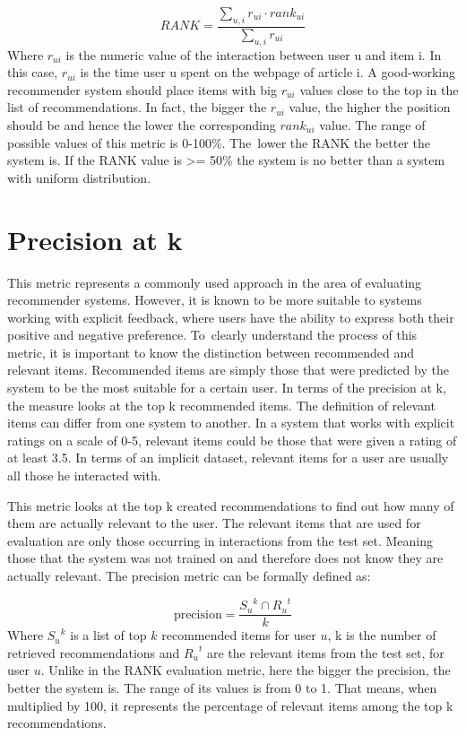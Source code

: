 \begin{equation}
    RANK = \frac{\sum_{u,i} r_{ui} \cdot rank_{ui}}{\sum_{u,i} r_{ui}}
\end{equation}
Where $r_{ui}$ is the numeric value of the interaction between user u and item i. In this case, $r_{ui}$ is the time user u spent on the webpage of article i. A good-working recommender system should place items with big $r_{ui}$ values close to the top in the list of recommendations. In fact, the bigger the $r_{ui}$ value, the higher the position should be and hence the lower the corresponding $rank_{ui}$ value. The range of possible values of this metric is 0-100\%. The~lower the RANK the better the system is. If the RANK value is >= 50\% the system is no better than a system with uniform distribution. \cite{Implicit}

\section{Precision at k}
This metric represents a commonly used approach in the area of evaluating recommender systems. However, it is known to be more suitable to systems working with explicit feedback, where users have the ability to express both their positive and negative preference. To~clearly understand the process of this metric, it is important to know the distinction between recommended and relevant items. Recommended items are simply those that were predicted by the system to be the most suitable for a certain user. In terms of the precision at k, the measure looks at the top k recommended items. The definition of relevant items can differ from one system to another. In a system that works with explicit ratings on a scale of 0-5, relevant items could be those that were given a rating of at least 3.5. In terms of an implicit dataset, relevant items for a user are usually all those he interacted with. 

This metric looks at the top k created recommendations to find out how many of them are actually relevant to the user. The relevant items that are used for evaluation are only those occurring in interactions from the test set. Meaning those that the system was not trained on and therefore does not know they are actually relevant. The precision metric can be formally defined as:

\begin{equation}
    \text{precision} = \frac{{S_u}^k \cap {R_u}^t}{k}
\end{equation}
Where ${S_u}^k$ is a list of top $k$ recommended items for user $u$, k is the number of retrieved recommendations and ${R_u}^t$ are the relevant items from the test set, for user $u$. Unlike in the RANK evaluation metric, here the bigger the precision, the better the system is. The range of its values is from 0 to 1. That means, when multiplied by 100, it represents the percentage of relevant items among the top k recommendations.


